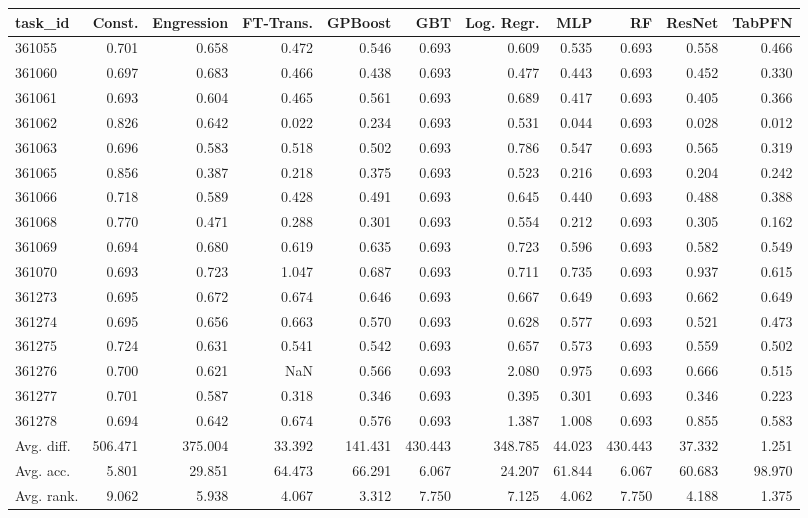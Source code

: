 \begin{tabular}{lrrrrrrrrrr}
\toprule
task\_id & Const. & Engression & FT-Trans. & GPBoost & GBT & Log. Regr. & MLP & RF & ResNet & TabPFN \\
\midrule
361055 & 0.701 & 0.658 & 0.472 & 0.546 & 0.693 & 0.609 & 0.535 & 0.693 & 0.558 & 0.466 \\
361060 & 0.697 & 0.683 & 0.466 & 0.438 & 0.693 & 0.477 & 0.443 & 0.693 & 0.452 & 0.330 \\
361061 & 0.693 & 0.604 & 0.465 & 0.561 & 0.693 & 0.689 & 0.417 & 0.693 & 0.405 & 0.366 \\
361062 & 0.826 & 0.642 & 0.022 & 0.234 & 0.693 & 0.531 & 0.044 & 0.693 & 0.028 & 0.012 \\
361063 & 0.696 & 0.583 & 0.518 & 0.502 & 0.693 & 0.786 & 0.547 & 0.693 & 0.565 & 0.319 \\
361065 & 0.856 & 0.387 & 0.218 & 0.375 & 0.693 & 0.523 & 0.216 & 0.693 & 0.204 & 0.242 \\
361066 & 0.718 & 0.589 & 0.428 & 0.491 & 0.693 & 0.645 & 0.440 & 0.693 & 0.488 & 0.388 \\
361068 & 0.770 & 0.471 & 0.288 & 0.301 & 0.693 & 0.554 & 0.212 & 0.693 & 0.305 & 0.162 \\
361069 & 0.694 & 0.680 & 0.619 & 0.635 & 0.693 & 0.723 & 0.596 & 0.693 & 0.582 & 0.549 \\
361070 & 0.693 & 0.723 & 1.047 & 0.687 & 0.693 & 0.711 & 0.735 & 0.693 & 0.937 & 0.615 \\
361273 & 0.695 & 0.672 & 0.674 & 0.646 & 0.693 & 0.667 & 0.649 & 0.693 & 0.662 & 0.649 \\
361274 & 0.695 & 0.656 & 0.663 & 0.570 & 0.693 & 0.628 & 0.577 & 0.693 & 0.521 & 0.473 \\
361275 & 0.724 & 0.631 & 0.541 & 0.542 & 0.693 & 0.657 & 0.573 & 0.693 & 0.559 & 0.502 \\
361276 & 0.700 & 0.621 & NaN & 0.566 & 0.693 & 2.080 & 0.975 & 0.693 & 0.666 & 0.515 \\
361277 & 0.701 & 0.587 & 0.318 & 0.346 & 0.693 & 0.395 & 0.301 & 0.693 & 0.346 & 0.223 \\
361278 & 0.694 & 0.642 & 0.674 & 0.576 & 0.693 & 1.387 & 1.008 & 0.693 & 0.855 & 0.583 \\
Avg. diff. & 506.471 & 375.004 & 33.392 & 141.431 & 430.443 & 348.785 & 44.023 & 430.443 & 37.332 & 1.251 \\
Avg. acc. & 5.801 & 29.851 & 64.473 & 66.291 & 6.067 & 24.207 & 61.844 & 6.067 & 60.683 & 98.970 \\
Avg. rank. & 9.062 & 5.938 & 4.067 & 3.312 & 7.750 & 7.125 & 4.062 & 7.750 & 4.188 & 1.375 \\
\bottomrule
\end{tabular}

